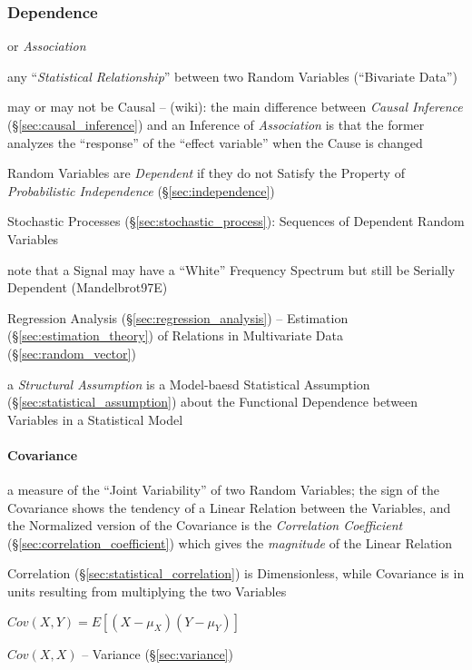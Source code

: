 \subsubsection{Dependence}\label{sec:dependence}

or \emph{Association}

any ``\emph{Statistical Relationship}'' between two Random Variables
(``Bivariate Data'')

may or may not be Causal -- (wiki): the main difference between
\emph{Causal Inference} (\S\ref{sec:causal_inference}) and an Inference of
\emph{Association} is that the former analyzes the ``response'' of the ``effect
variable'' when the Cause is changed

Random Variables are \emph{Dependent} if they do not Satisfy the Property of
\emph{Probabilistic Independence} (\S\ref{sec:independence})

Stochastic Processes (\S\ref{sec:stochastic_process}): Sequences of Dependent
Random Variables

note that a Signal may have a ``White'' Frequency Spectrum but still be Serially
Dependent (Mandelbrot97E)

\fist Regression Analysis (\S\ref{sec:regression_analysis}) -- Estimation
(\S\ref{sec:estimation_theory}) of Relations in Multivariate Data
(\S\ref{sec:random_vector})

\fist a \emph{Structural Assumption} is a Model-baesd Statistical Assumption
(\S\ref{sec:statistical_assumption}) about the Functional Dependence between
Variables in a Statistical Model



\paragraph{Covariance}\label{sec:covariance}\hfill

a measure of the ``Joint Variability'' of two Random Variables; the sign of the
Covariance shows the tendency of a Linear Relation between the Variables, and
the Normalized version of the Covariance is the \emph{Correlation Coefficient}
(\S\ref{sec:correlation_coefficient}) which gives the \emph{magnitude} of the
Linear Relation

Correlation (\S\ref{sec:statistical_correlation}) is Dimensionless, while
Covariance is in units resulting from multiplying the two Variables

$Cov(X,Y) = E [(X - \mu_X)(Y - \mu_Y)]$

$Cov(X,X)$ -- Variance (\S\ref{sec:variance})

